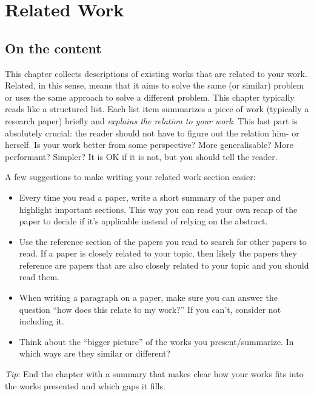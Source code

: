 \chapter{Related Work}
\label{chp:relatedwork}
\section{On the content}
This chapter collects descriptions of existing works that are related to your work. Related, in this sense, means that it aims to solve the same (or similar) problem or uses the same approach to solve a different problem. This chapter typically reads like a structured list. Each list item summarizes a piece of work (typically a research paper) briefly and \emph{explains the relation to your work}. This last part is absolutely crucial: the reader should not have to figure out the relation him- or herself. Is your work better from some perspective? More generalisable? More performant? Simpler? It is OK if it is not, but you should tell the reader.

A few suggestions to make writing your related work section easier:
\begin{itemize}
    \item Every time you read a paper, write a short summary of the paper and highlight important sections. This way you can read your own recap of the paper to decide if it's applicable instead of relying on the abstract.
    \item Use the reference section of the papers you read to search for other papers to read. If a paper is closely related to your topic, then likely the papers they reference are papers that are also closely related to your topic and you should read them.
    \item When writing a paragraph on a paper, make sure you can answer the question ``how does this relate to my work?'' If you can't, consider not including it. 
    \item Think about the ``bigger picture'' of the works you present/summarize. In which ways are they similar or different? 
\end{itemize}
    
\emph{Tip}: End the chapter with a summary that makes clear how your works fits into the works presented and which gaps it fills.